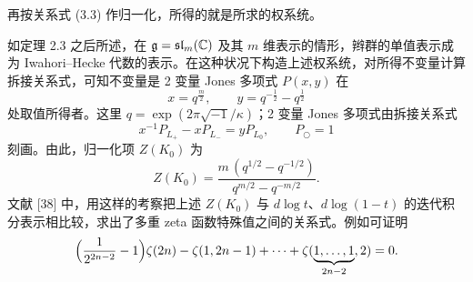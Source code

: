 再按关系式 (3.3) 作归一化，所得的就是所求的权系统。

如定理 2.3 之后所述，在 $\mathfrak{g}=\mathfrak{sl}_m(\mathbb{C})$ 及其 $m$ 维表示的情形，辫群的单值表示成为 Iwahori--Hecke 代数的表示。在这种状况下构造上述权系统，对所得不变量计算拆接关系式，可知不变量是 2 变量 Jones 多项式 $P(x,y)$ 在
\[
  x=q^{\frac{m}{2}},\qquad y=q^{-\frac{1}{2}}-q^{\frac{1}{2}}
\]
处取值所得者。这里 $q=\exp(2\pi\sqrt{-1}/\kappa)$；2 变量 Jones 多项式由拆接关系式
\[
  x^{-1}P_{L_+}-xP_{L_-}=yP_{L_0},\qquad P_{\bigcirc}=1
\]
刻画。由此，归一化项 $Z(K_0)$ 为
\[
  Z(K_0)=\frac{m\,(q^{1/2}-q^{-1/2})}{q^{m/2}-q^{-m/2}} .
\]
文献 [38] 中，用这样的考察把上述 $Z(K_0)$ 与 $d\log t$、$d\log(1-t)$ 的迭代积分表示相比较，求出了多重 zeta 函数特殊值之间的关系式。例如可证明
\[
  \Bigl(\frac{1}{2^{2n-2}}-1\Bigr)\zeta(2n)-\zeta(1,2n-1)+\cdots
  +\zeta(\underbrace{1,\dots,1}_{2n-2},2)=0 .
\]






